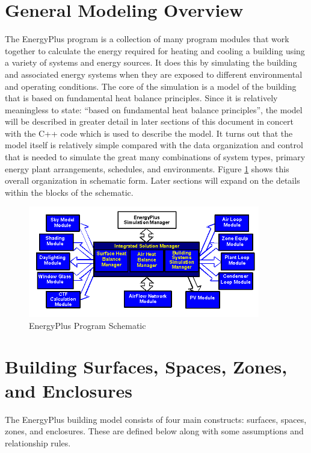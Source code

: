 \section{General Modeling Overview}\label{general-modeling-overview}

The EnergyPlus program is a collection of many program modules that work together to calculate the energy required for heating and cooling a building using a variety of systems and energy sources. It does this by simulating the building and associated energy systems when they are exposed to different environmental and operating conditions. The core of the simulation is a model of the building that is based on fundamental heat balance principles. Since it is relatively meaningless to state: ``based on fundamental heat balance principles'', the model will be described in greater detail in later sections of this document in concert with the C++ code which is used to describe the model. It turns out that the model itself is relatively simple compared with the data organization and control that is needed to simulate the great many combinations of system types, primary energy plant arrangements, schedules, and environments. Figure \ref{fig:energyplus-program-schematic} shows this overall organization in schematic form. Later sections will expand on the details within the blocks of the schematic.

\begin{figure}[hbtp] %
\centering
\includegraphics[width=0.9\textwidth, height=0.9\textheight, keepaspectratio=true]{media/image1.png}
\caption{EnergyPlus Program Schematic \protect \label{fig:energyplus-program-schematic}}
\end{figure}

\section{Building Surfaces, Spaces, Zones, and Enclosures}\label{building-spaces-zones-enclosures}
The EnergyPlus building model consists of four main constructs: surfaces, spaces, zones, and enclosures. These are defined below along with some assumptions and relationship rules.

